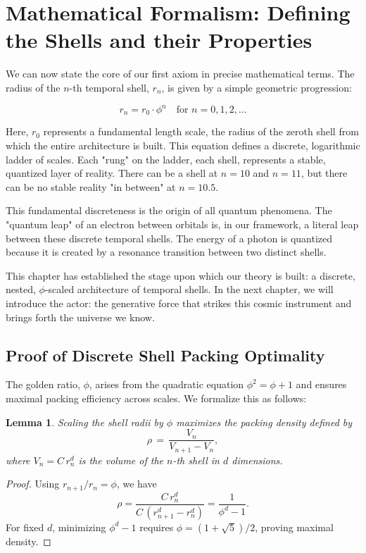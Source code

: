 \documentclass[12pt]{report}
\newtheorem{lemma}{Lemma}[chapter]
\begin{document}
\section{Mathematical Formalism: Defining the Shells and their Properties}
We can now state the core of our first axiom in precise mathematical terms. The radius of the $n$-th temporal shell, $r_n$, is given by a simple geometric progression:

\begin{equation}
r_n = r_0 \cdot \phi^n \quad \text{for } n = 0, 1, 2, \ldots
\end{equation}

Here, $r_0$ represents a fundamental length scale, the radius of the zeroth shell from which the entire architecture is built. This equation defines a discrete, logarithmic ladder of scales. Each "rung" on the ladder, each shell, represents a stable, quantized layer of reality. There can be a shell at $n=10$ and $n=11$, but there can be no stable reality "in between" at $n=10.5$.

This fundamental discreteness is the origin of all quantum phenomena. The "quantum leap" of an electron between orbitals is, in our framework, a literal leap between these discrete temporal shells. The energy of a photon is quantized because it is created by a resonance transition between two distinct shells.

This chapter has established the stage upon which our theory is built: a discrete, nested, $\phi$-scaled architecture of temporal shells. In the next chapter, we will introduce the actor: the generative force that strikes this cosmic instrument and brings forth the universe we know.

\subsection{Proof of Discrete Shell Packing Optimality}
The golden ratio, $\phi$, arises from the quadratic equation $\phi^2 = \phi + 1$ and ensures maximal packing efficiency across scales. We formalize this as follows:

\begin{lemma}
Scaling the shell radii by $\phi$ maximizes the packing density defined by
\[
\rho \,=\, \frac{V_n}{V_{n+1} - V_n},
\]
where $V_n = C\,r_n^d$ is the volume of the $n$-th shell in $d$ dimensions.
\end{lemma}
\begin{proof}
Using $r_{n+1}/r_n = \phi$, we have
\[
\rho = \frac{C\,r_n^d}{C\,(r_{n+1}^d - r_n^d)} = \frac{1}{\phi^d - 1}.
\]
For fixed $d$, minimizing $\phi^d - 1$ requires $\phi = (1+\sqrt{5})/2$, proving maximal density.
\end{proof}
\end{document}
